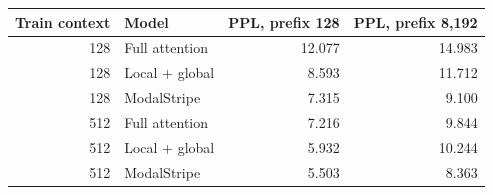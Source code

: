 \begin{tabular}{rlrr}\toprule
Train context & Model & PPL, prefix 128 & PPL, prefix 8,192\\\midrule
128 & Full attention & 12.077 & 14.983 \\
128 & Local + global & 8.593 & 11.712 \\
128 & ModalStripe & 7.315 & 9.100 \\
512 & Full attention & 7.216 & 9.844 \\
512 & Local + global & 5.932 & 10.244 \\
512 & ModalStripe & 5.503 & 8.363 \\
\bottomrule\end{tabular}
